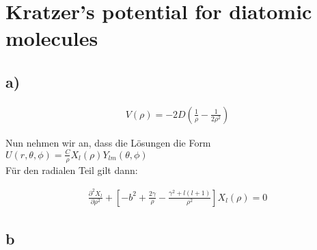 \section{Kratzer's potential for diatomic molecules}

\subsection{a)}

\begin{align}
V \left(\rho\right) = -2D \left(\frac{1}{\rho} - \frac{1}{2\rho^2} \right)
\end{align}

Nun nehmen wir an, dass die L\"osungen die Form \\
$U \left(r,\theta, \phi\right) = \frac{C}{\rho} X_l \left(\rho\right) Y_{lm}
\left(\theta, \phi\right)$ \\

F\"ur den radialen Teil gilt dann:

\begin{align}
\frac{\partial^2 X_l}{\partial \rho^2} + \left[-b^2 +
\frac{2\gamma}{\rho} - \frac{\gamma^2 + l \left(l+1\right)}{\rho^2} \right] X_l
\left(\rho\right) = 0
\end{align}

\subsection{b}

